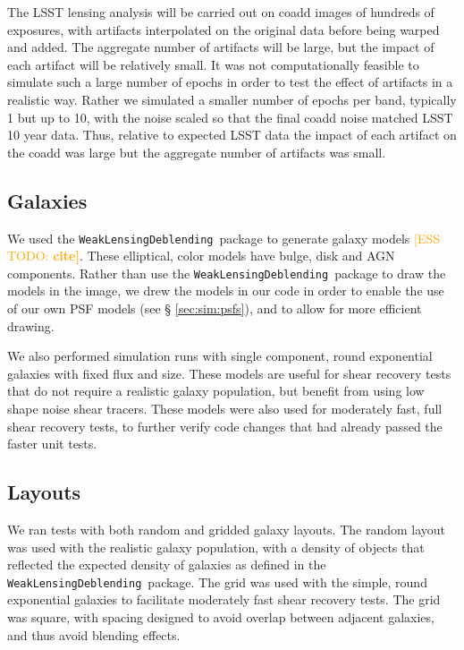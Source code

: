 \documentclass[twocolumn,twocolappendix,astrosym]{openjournal}
\newcommand{\esstodo}[1]{\textcolor{orange}{[ESS TODO: \bf #1]}}
\newcommand{\descwl}{\texttt{WeakLensingDeblending}}
\begin{document}
The LSST lensing analysis will be carried out on coadd images of hundreds of
exposures, with artifacts interpolated on the original data before being warped
and added.  The aggregate number of artifacts will be large, but the impact of
each artifact will be relatively small.  It was not computationally feasible to
simulate such a large number of epochs in order to test the effect of artifacts
in a realistic way.  Rather we simulated a smaller number of epochs per
band, typically
1 but up to 10, with the noise scaled so that the final coadd noise matched
LSST 10 year data.  Thus, relative to expected LSST data the impact of each
artifact on the coadd was large but the aggregate number of artifacts was
small.

\subsection{Galaxies} \label{sec:sim:galaxies}

We used the \descwl\ package to generate galaxy models \esstodo{cite}.  These
elliptical, color models have bulge, disk and AGN components.  Rather than use
the \descwl\ package to draw the models in the image, we drew the models in our
code in order to enable the use of our own PSF models (see \S
\ref{sec:sim:psfs}), and to allow for more efficient drawing.

We also performed simulation runs with single component, round exponential
galaxies with fixed flux and size.  These models are useful for shear recovery
tests that do not require a realistic galaxy population, but benefit from using
low shape noise shear tracers.  These models were also used for moderately
fast, full shear recovery tests, to further verify code changes that had
already passed the faster unit tests.

\subsection{Layouts} \label{sec:sim:layouts}

We ran tests with both random and gridded galaxy layouts.  The random layout
was used with the realistic galaxy population, with a density of objects that
reflected the expected density of galaxies as defined in the \descwl\ package.
The grid was used with the simple, round exponential galaxies to facilitate
moderately fast shear recovery tests.  The grid was square, with spacing
designed to avoid overlap between adjacent galaxies, and thus avoid blending
effects.
\end{document}
